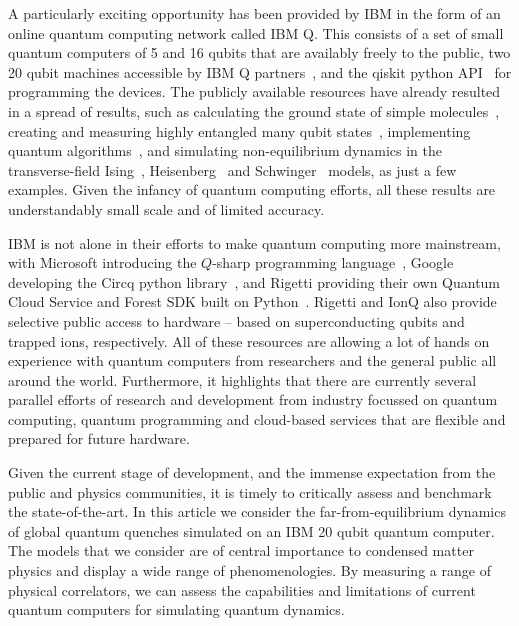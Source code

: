 \documentclass[twocolumn,showpacs,preprintnumbers,nofootinbib,amsmath,aps,pra,longbibliography,amssymb,superscriptaddress]{revtex4-1}
\begin{document}
A particularly exciting opportunity has been provided by IBM in the form of an online quantum computing network called IBM Q. This consists of a set of small quantum computers of 5 and 16 qubits that are availably freely to the public, two 20 qubit machines accessible by IBM Q partners~\cite{IBMQ}, and the qiskit python API~\cite{qiskit} for programming the devices.
The publicly available resources have already resulted in a spread of results, such as calculating the ground state of simple molecules~\cite{OMalley2016,Kandala2017}, creating and measuring highly entangled many qubit states~\cite{Wang2018,Choo2018}, implementing quantum algorithms~\cite{Bravo-Prieto2019,Doronin2019,Amico2019}, and simulating non-equilibrium dynamics in the transverse-field Ising~\cite{Zhukov2018,Cervera-Lierta2018}, Heisenberg~\cite{Lamm2018} and Schwinger~\cite{Klco2018} models, as just a few examples. Given the infancy of quantum computing efforts, all these results are understandably small scale and of limited accuracy. 

IBM is not alone in their efforts to make quantum computing more mainstream, with Microsoft introducing the $Q$-sharp programming language~\cite{q-sharp}, Google developing the Circq python library~\cite{circq}, and Rigetti providing their own Quantum Cloud Service and Forest SDK built on Python~\cite{pyquil}. Rigetti and IonQ also provide selective public access to hardware -- based on superconducting qubits and trapped ions, respectively. All of these resources are allowing a lot of hands on experience with quantum computers from researchers and the general public all around the world. Furthermore, it highlights that there are currently several parallel efforts of research and development from industry focussed on quantum computing, quantum programming and cloud-based services that are flexible and prepared for future hardware. 

Given the current stage of development, and the immense expectation from the public and physics communities, it is timely to critically assess and benchmark the state-of-the-art. In this article we consider the far-from-equilibrium dynamics of global quantum quenches simulated on an IBM 20 qubit quantum computer. The models that we consider are of central importance to condensed matter physics and display a wide range of phenomenologies. By measuring a range of physical correlators, we can assess the capabilities and limitations of current quantum computers for simulating quantum dynamics.
\end{document}

